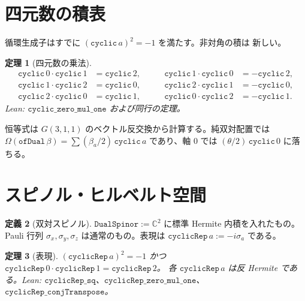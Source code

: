 \documentclass[dvipdfmx,11pt,a4paper]{jsarticle}
\newtheorem{theorem}{定理}[section]
\theoremstyle{definition}
\newtheorem{definition}[theorem]{定義}
\theoremstyle{remark}
\begin{document}
\section{四元数の積表}
\label{sec:quat}

循環生成子はすでに $(\texttt{cyclic}\,a)^2=-1$ を満たす。非対角の積は
新しい。

\begin{theorem}[四元数の乗法]
\label{thm:quat}
\[
\begin{aligned}
\texttt{cyclic}\,0\cdot\texttt{cyclic}\,1&=\texttt{cyclic}\,2,\\
\texttt{cyclic}\,1\cdot\texttt{cyclic}\,2&=\texttt{cyclic}\,0,\\
\texttt{cyclic}\,2\cdot\texttt{cyclic}\,0&=\texttt{cyclic}\,1,
\end{aligned}
\qquad
\begin{aligned}
\texttt{cyclic}\,1\cdot\texttt{cyclic}\,0&=-\texttt{cyclic}\,2,\\
\texttt{cyclic}\,2\cdot\texttt{cyclic}\,1&=-\texttt{cyclic}\,0,\\
\texttt{cyclic}\,0\cdot\texttt{cyclic}\,2&=-\texttt{cyclic}\,1.
\end{aligned}
\]
Lean: $\texttt{cyclic\_zero\_mul\_one}$ および同行の定理。
\end{theorem}

恒等式は $G(3,1,1)$ のベクトル反交換から計算する。純双対配置では
$\Omega(\texttt{ofDual}\,\beta)=\sum(\beta_a/2)\,\texttt{cyclic}\,a$
であり、軸 $0$ では $(\theta/2)\,\texttt{cyclic}\,0$ に落ちる。

\section{スピノル・ヒルベルト空間}
\label{sec:spinor}

\begin{definition}[双対スピノル]
$\texttt{DualSpinor}:=\mathbb{C}^2$ に標準 Hermite 内積を入れたもの。
Pauli 行列 $\sigma_x,\sigma_y,\sigma_z$ は通常のもの。表現は
$\texttt{cyclicRep}\,a:=-i\sigma_a$ である。
\end{definition}

\begin{theorem}[表現]
\label{thm:rep}
$(\texttt{cyclicRep}\,a)^2=-1$ かつ
$\texttt{cyclicRep}\,0\cdot\texttt{cyclicRep}\,1=\texttt{cyclicRep}\,2$。
各 $\texttt{cyclicRep}\,a$ は反 Hermite である。Lean:
$\texttt{cyclicRep\_sq}$、$\texttt{cyclicRep\_zero\_mul\_one}$、
$\texttt{cyclicRep\_conjTranspose}$。
\end{theorem}
\end{document}
